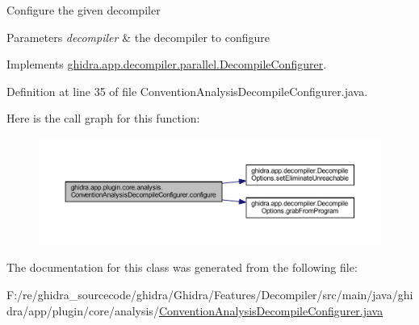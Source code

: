 Configure the given decompiler


\begin{DoxyParams}{Parameters}
{\em decompiler} & the decompiler to configure \\
\hline
\end{DoxyParams}


Implements \mbox{\hyperlink{interfaceghidra_1_1app_1_1decompiler_1_1parallel_1_1_decompile_configurer_a168fbd0001569c08cc1008e0b22c8f68}{ghidra.\+app.\+decompiler.\+parallel.\+Decompile\+Configurer}}.



Definition at line 35 of file Convention\+Analysis\+Decompile\+Configurer.\+java.

Here is the call graph for this function\+:
\nopagebreak
\begin{figure}[H]
\begin{center}
\leavevmode
\includegraphics[width=350pt]{classghidra_1_1app_1_1plugin_1_1core_1_1analysis_1_1_convention_analysis_decompile_configurer_adc88f5c9f1553203058c35fdcda69cfb_cgraph}
\end{center}
\end{figure}


The documentation for this class was generated from the following file\+:\begin{DoxyCompactItemize}
\item 
F\+:/re/ghidra\+\_\+sourcecode/ghidra/\+Ghidra/\+Features/\+Decompiler/src/main/java/ghidra/app/plugin/core/analysis/\mbox{\hyperlink{_convention_analysis_decompile_configurer_8java}{Convention\+Analysis\+Decompile\+Configurer.\+java}}\end{DoxyCompactItemize}
